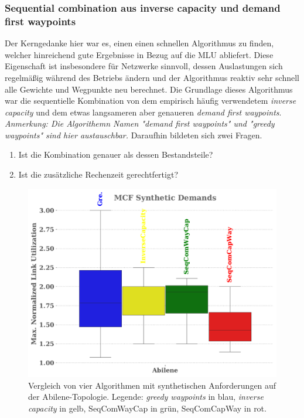 \documentclass[sigconf, nonacm, review]{acmart}
\begin{document}
\subsubsection{Sequential combination aus inverse capacity und demand first waypoints}
Der Kerngedanke hier war es, einen einen schnellen Algorithmus zu finden, 
welcher hinreichend gute Ergebnisse in Bezug auf die MLU abliefert.
Diese Eigenschaft ist insbesondere f\"ur Netzwerke sinnvoll,
dessen Auslastungen sich regelm\"a\ss ig w\"ahrend des Betriebs \"andern und der Algorithmus reaktiv sehr schnell alle Gewichte und Wegpunkte neu berechnet.\newline
Die Grundlage dieses Algorithmus war die sequentielle Kombination von dem empirisch h\"aufig verwendetem \emph{inverse capacity} und dem etwas langsameren aber genaueren \emph{demand first waypoints}.
\emph{Anmerkung: Die Algorithemn Namen "\emph{demand first waypoints}" und "\emph{greedy waypoints}" sind hier austauschbar.}\newline
Daraufhin bildeten sich zwei Fragen.
\begin{enumerate}
    \item Ist die Kombination genauer als dessen Bestandsteile?
    \item Ist die zus\"atzliche Rechenzeit gerechtfertigt?
\end{enumerate}
\begin{figure}
\centering
\includegraphics[width=\linewidth]{figures/pouria_all_algorithms_abilene.pdf}
\caption{Vergleich von vier Algorithmen mit synthetischen Anforderungen auf der Abilene-Topologie. Legende: \emph{greedy waypoints} in blau, \emph{inverse capacity} in gelb, SeqComWayCap in gr\"un, SeqComCapWay in rot.}
\label{fig:pouriaBoxplotSynthetic}
\end{figure}
\end{document}
